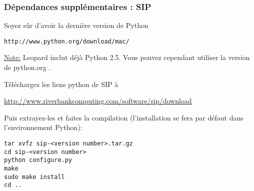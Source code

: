 % 
% 
% 
% 
% 
% 
% 
% 
% 

\subsubsection{D\'ependances suppl\'ementaires : SIP}
Soyez s\^ur d'avoir la derni\`ere version de Python

\begin{verbatim}
http://www.python.org/download/mac/
\end{verbatim}

\underline{Note:} Leopard inclut d\'ej\`a Python 2.5.  Vous pouvez cependant utiliser la version de python.org .

T\'el\'echargez les liens python de SIP \`a

\url{http://www.riverbankcomputing.com/software/sip/download}

Puis extrayez-les et faites la compilation (l'installation se fera par d\'efaut dans l'environnement Python):

\begin{verbatim}
tar xvfz sip-<version number>.tar.gz 
cd sip-<version number>
python configure.py 
make 
sudo make install 
cd ..  
\end{verbatim}


